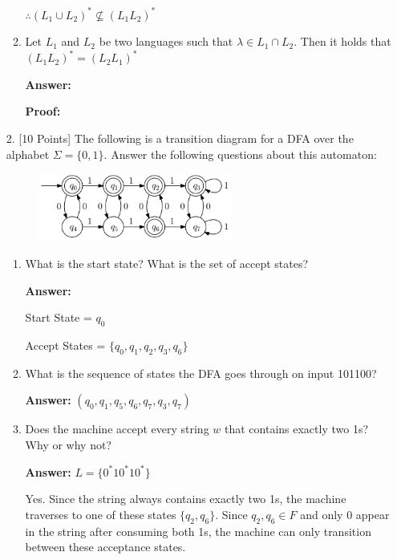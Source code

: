 \documentclass[12pt]{article}
\begin{document}
\begin{spacing}{1.5}
\begin{enumerate}
\begin{enumerate}
			            $\therefore (L_1 \cup L_2)^* \not\subseteq (L_1L_2)^*$

			      \item Let $L_1$ and $L_2$ be two languages such that $\lambda \in L_1 \cap L_2$. Then it holds that $(L_1L_2)^* = (L_2L_1)^*$

			            \noindent \textbf{Answer:}

			            \noindent \textbf{Proof:}

		      \end{enumerate}

		      \newpage

		\item[2.] [10 Points] The following is a transition diagram for a DFA over the alphabet $\Sigma = \{0,1\}$. Answer the following questions about this automaton:

		      \begin{figure}[h!]
			      \centering
			      \includegraphics[width=0.6\textwidth]{img/q2/q2_automata.png}
		      \end{figure}

		      \begin{enumerate}
			      \item What is the start state? What is the set of accept states?

			            \noindent \textbf{Answer:}

			            Start State = $q_0$

			            Accept States = $\{q_0, q_1, q_2, q_3, q_6\}$

			      \item What is the sequence of states the DFA goes through on input 101100?

			            \noindent \textbf{Answer:} $(q_0, q_1, q_5, q_6, q_7, q_3, q_7)$

			      \item Does the machine accept every string $w$ that contains exactly two 1s? Why or why not?

			            \noindent \textbf{Answer:} $L = \{0^*10^*10^* \}$

			            Yes. Since the string always contains exactly two 1s, the machine traverses to one of these states $\{q_2, q_6 \}$. Since $q_2, q_6 \in F$ and only 0 appear in the string after consuming both 1s, the machine can only transition between these acceptance states.


\end{enumerate}
\end{enumerate}
\end{spacing}
\end{document}

